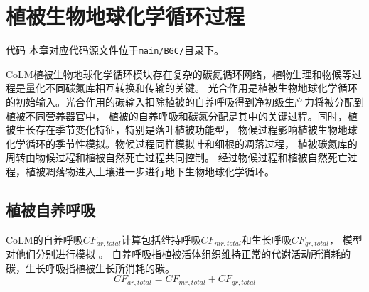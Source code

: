 \chapter{植被生物地球化学循环过程}\label{植被生物地球化学循环过程}
\begin{mymdframed}{代码}
本章对应代码源文件位于\texttt{main/BGC/}目录下。
\end{mymdframed}

CoLM植被生物地球化学循环模块存在复杂的碳氮循环网络，植物生理和物候等过程是量化不同碳氮库相互转换和传输的关键。
光合作用是植被生物地球化学循环的初始输入。光合作用的碳输入扣除植被的自养呼吸得到净初级生产力将被分配到植被不同营养器官中，
植被的自养呼吸和碳氮分配是其中的关键过程。同时，植被生长存在季节变化特征，特别是落叶植被功能型，
物候过程影响植被生物地球化学循环的季节性模拟。物候过程同样模拟叶和细根的凋落过程，
植被碳氮库的周转由物候过程和植被自然死亡过程共同控制。
经过物候过程和植被自然死亡过程，植被凋落物进入土壤进一步进行地下生物地球化学循环。
\section{植被自养呼吸}\label{植被自养呼吸}

CoLM的自养呼吸$CF_{ar,total}$计算包括维持呼吸$CF_{mr,total}$和生长呼吸$CF_{gr,total}$，
模型对他们分别进行模拟 \citep{lavigne1997growth,sprugel1995respiration}。
自养呼吸指植被活体组织维持正常的代谢活动所消耗的碳，生长呼吸指植被生长所消耗的碳。
\begin{equation}
CF_{ar,total}=CF_{mr, total}+CF_{gr,total}
\end{equation}
